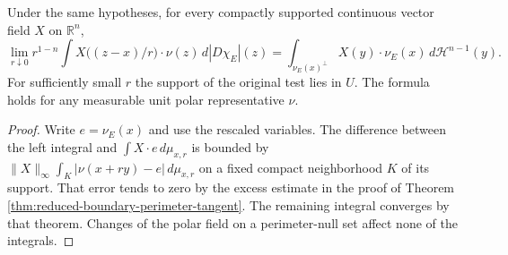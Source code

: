 \begin{proposition}\label{prop:reduced-boundary-normal-tests}
Under the same hypotheses, for every compactly supported continuous vector field $X$ on $\mathbb R^n$,
\[
 \lim_{r\downarrow0}r^{1-n}
 \int X\bigl((z-x)/r\bigr)\cdot\nu(z)\,d|D\chi_E|(z)
 =\int_{\nu_E(x)^\perp}X(y)\cdot\nu_E(x)\,d\mathcal H^{n-1}(y).
\]
For sufficiently small $r$ the support of the original test lies in $U$. The formula holds for any measurable unit polar representative $\nu$.
\end{proposition}
\begin{proof}
Write $e=\nu_E(x)$ and use the rescaled variables. The difference between the left integral and $\int X\cdot e\,d\mu_{x,r}$ is bounded by $\|X\|_\infty\int_K|\nu(x+ry)-e|\,d\mu_{x,r}$ on a fixed compact neighborhood $K$ of its support. That error tends to zero by the excess estimate in the proof of Theorem \ref{thm:reduced-boundary-perimeter-tangent}. The remaining integral converges by that theorem. Changes of the polar field on a perimeter-null set affect none of the integrals.
\end{proof}
